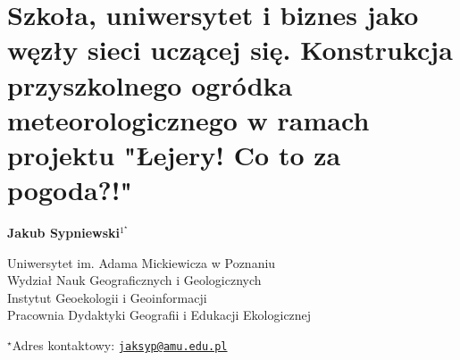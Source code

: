 \documentclass[\main/boa.tex]{subfiles}
\begin{document}
\section{Szkoła, uniwersytet i biznes jako węzły sieci uczącej się. Konstrukcja przyszkolnego ogródka meteorologicznego w ramach projektu "Łejery! Co to za pogoda?!"}

\begin{center}
  {\bf {} Jakub Sypniewski$^{1^\star}$}
\end{center}

\vskip 0.3cm

\begin{affiliations}
\begin{enumerate}
\begin{minipage}{0.915\textwidth}
\centering
\item Uniwersytet im. Adama Mickiewicza w Poznaniu\\ Wydział Nauk Geograficznych i Geologicznych\\ Instytut Geoekologii i Geoinformacji \\ Pracownia Dydaktyki Geografii i Edukacji Ekologicznej\\[-2pt]
\end{minipage}
\end{enumerate}
$^\star$Adres kontaktowy: \href{mailto:jaksyp@amu.edu.pl}{\nolinkurl{jaksyp@amu.edu.pl}}\\
\end{affiliations}

\vskip 0.5cm


\vskip 0.5cm
\end{document}
